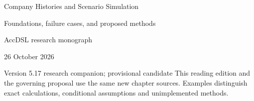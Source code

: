 \documentclass[11pt,a4paper]{report}
\begin{document}
\hypersetup{pageanchor=false}
\begin{titlepage}
{\Huge Company Histories and Scenario Simulation\par}
\vspace{12mm}
{\Large Foundations, failure cases, and proposed methods\par}
\vspace{8mm}
AccDSL research monograph\par 26 October 2026\par Version 5.17 research companion; provisional candidate
\vfill
This reading edition and the governing proposal use the same new chapter sources. Examples distinguish exact calculations, conditional assumptions and unimplemented methods.
\end{titlepage}
\hypersetup{pageanchor=true}
\tableofcontents
\clearpage{}


























\clearpage\label{sim:body-end}

\begingroup\raggedright
\endgroup
\end{document}
